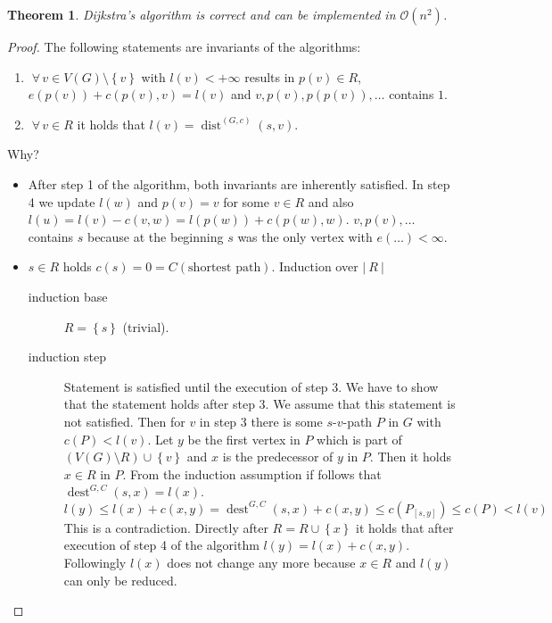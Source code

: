 \documentclass{article}
\newtheorem{theorem}{Theorem}
\newcommand{\card}[1]{\left|\:\!#1\:\!\right|}
\newcommand{\set}[1]{\left\{#1\right\}}
\newcommand{\gath}[2]{$#1$-$#2$-path} %
\newcommand{\fall}{\;\forall\,}
\begin{document}
\begin{theorem}\label{satz-3.2}
  Dijkstra's algorithm is correct and can be implemented in $\mathcal{O}(n^2)$.
\end{theorem}

\begin{proof}
  The following statements are invariants of the algorithms:
  \begin{enumerate}
    \item $\fall v \in V(G) \setminus \set{v}$ with $l(v) < +\infty$ results in $p(v) \in R$, $e(p(v)) + c(p(v), v) = l(v)$ and $v, p(v), p(p(v)), \ldots$ contains $1$.
    \item $\fall v \in R$ it holds that $l(v) = \operatorname{dist}^{(G,c)}(s, v)$.
  \end{enumerate}
  Why?
  \begin{itemize}
    \item
      After step 1 of the algorithm, both invariants are inherently satisfied.
      In step 4 we update $l(w)$ and $p(v) = v$ for some $v \in R$ and also $l(u) = l(v) - c(v, w) = l(p(w)) + c(p(w), w)$. $v, p(v), \ldots$ contains $s$ because at the beginning $s$ was the only vertex with $e(\dots) < \infty$.
    \item
      $s \in R$ holds $c(s) = 0 = C(\text{shortest path})$.
      Induction over $\card{R}$
      \begin{description}
        \item[induction base] $R = \set{s}$ (trivial).
        \item[induction step] Statement is satisfied until the execution of step 3. We have to show that the statement holds after step 3. We assume that this statement is not satisfied. Then for $v$ in step 3 there is some \gath sv $P$ in $G$ with $c(P) < l(v)$. Let $y$ be the first vertex in $P$ which is part of $(V(G) \setminus R) \cup \set{v}$ and $x$ is the predecessor of $y$ in $P$.
        Then it holds $x \in R$ in $P$. From the induction assumption if follows that $\operatorname{dest}^{G,C}(s,x) = l(x)$.
        \[
          l(y) \leq l(x) + c(x, y) = \operatorname{dest}^{G,C}(s, x) + c(x,y) \leq c(P_{[s,y]}) \leq c(P) < l(v)
        \]
        This is a contradiction.
        Directly after $R = R \cup \set{x}$ it holds that after execution of step 4 of the algorithm $l(y) = l(x) + c(x, y)$. Followingly $l(x)$ does not change any more because $x \in R$ and $l(y)$ can only be reduced.
      \end{description}
  \end{itemize}
\end{proof}
\end{document}
